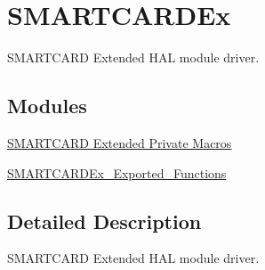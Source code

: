 \hypertarget{group___s_m_a_r_t_c_a_r_d_ex}{}\section{S\+M\+A\+R\+T\+C\+A\+R\+D\+Ex}
\label{group___s_m_a_r_t_c_a_r_d_ex}


S\+M\+A\+R\+T\+C\+A\+RD Extended H\+AL module driver.  


\subsection*{Modules}
\begin{DoxyCompactItemize}
\item 
\hyperlink{group___s_m_a_r_t_c_a_r_d_ex___private___macros}{S\+M\+A\+R\+T\+C\+A\+R\+D Extended Private Macros}
\item 
\hyperlink{group___s_m_a_r_t_c_a_r_d_ex___exported___functions}{S\+M\+A\+R\+T\+C\+A\+R\+D\+Ex\+\_\+\+Exported\+\_\+\+Functions}
\end{DoxyCompactItemize}


\subsection{Detailed Description}
S\+M\+A\+R\+T\+C\+A\+RD Extended H\+AL module driver. 

